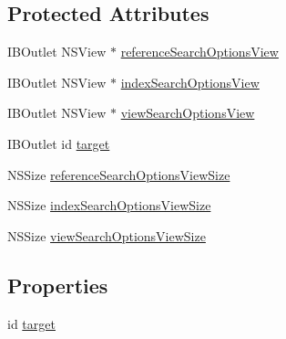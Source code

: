 \subsection*{Protected Attributes}
\begin{DoxyCompactItemize}
\item 
I\-B\-Outlet N\-S\-View $\ast$ \hyperlink{interface_search_options_view_controller_a9fdbd2ea74a7a50206b5b26bb0e5a935}{reference\-Search\-Options\-View}
\item 
I\-B\-Outlet N\-S\-View $\ast$ \hyperlink{interface_search_options_view_controller_a902e621c0eb5216cacf17b8f87289878}{index\-Search\-Options\-View}
\item 
I\-B\-Outlet N\-S\-View $\ast$ \hyperlink{interface_search_options_view_controller_af23b42b63a9538a0775e4b480da19069}{view\-Search\-Options\-View}
\item 
I\-B\-Outlet id \hyperlink{interface_search_options_view_controller_a1a27f5c62bf705bf1b3892aa57952941}{target}
\item 
N\-S\-Size \hyperlink{interface_search_options_view_controller_a68f0737c575acf2f3e9c9d08c1bb608c}{reference\-Search\-Options\-View\-Size}
\item 
N\-S\-Size \hyperlink{interface_search_options_view_controller_affb0fc90a391613901d409dacae35dfe}{index\-Search\-Options\-View\-Size}
\item 
N\-S\-Size \hyperlink{interface_search_options_view_controller_a46b55ef00a7ba3b2a66d36242853e564}{view\-Search\-Options\-View\-Size}
\end{DoxyCompactItemize}
\subsection*{Properties}
\begin{DoxyCompactItemize}
\item 
id \hyperlink{interface_search_options_view_controller_a010e439a502e2d3495a83031b1df484e}{target}
\end{DoxyCompactItemize}



